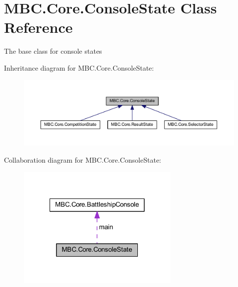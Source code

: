 \hypertarget{class_m_b_c_1_1_core_1_1_console_state}{\section{M\-B\-C.\-Core.\-Console\-State Class Reference}
\label{class_m_b_c_1_1_core_1_1_console_state}
}


The base class for console states 




Inheritance diagram for M\-B\-C.\-Core.\-Console\-State\-:\nopagebreak
\begin{figure}[H]
\begin{center}
\leavevmode
\includegraphics[width=350pt]{class_m_b_c_1_1_core_1_1_console_state__inherit__graph}
\end{center}
\end{figure}


Collaboration diagram for M\-B\-C.\-Core.\-Console\-State\-:\nopagebreak
\begin{figure}[H]
\begin{center}
\leavevmode
\includegraphics[width=222pt]{class_m_b_c_1_1_core_1_1_console_state__coll__graph}
\end{center}
\end{figure}
